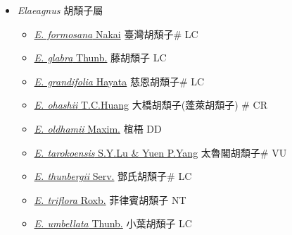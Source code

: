 
  \begin{itemize}
 \item[] \textit{Elaeagnus} 胡頹子屬
                    
  \begin{itemize}
        \item[] \href{http://www.theplantlist.org/tpl1.1/search?q=Elaeagnus+formosana}{\textit{E. formosana} Nakai}   臺灣胡頹子\# LC
        \item[] \href{http://www.theplantlist.org/tpl1.1/search?q=Elaeagnus+glabra}{\textit{E. glabra} Thunb.}   藤胡頹子 LC
        \item[] \href{http://www.theplantlist.org/tpl1.1/search?q=Elaeagnus+grandifolia}{\textit{E. grandifolia} Hayata}   慈恩胡頹子\# LC
        \item[] \href{http://www.theplantlist.org/tpl1.1/search?q=Elaeagnus+ohashii}{\textit{E. ohashii} T.C.Huang}     大橋胡頹子(蓬萊胡頹子)  \# CR
        \item[] \href{http://www.theplantlist.org/tpl1.1/search?q=Elaeagnus+oldhamii}{\textit{E. oldhamii} Maxim.}   椬梧 DD
        \item[] \href{http://www.theplantlist.org/tpl1.1/search?q=Elaeagnus+tarokoensis}{\textit{E. tarokoensis} S.Y.Lu \& Yuen P.Yang}   太魯閣胡頹子\# VU
        \item[] \href{http://www.theplantlist.org/tpl1.1/search?q=Elaeagnus+thunbergii}{\textit{E. thunbergii} Serv.}   鄧氏胡頹子\# LC
        \item[] \href{http://www.theplantlist.org/tpl1.1/search?q=Elaeagnus+triflora}{\textit{E. triflora} Roxb.}   菲律賓胡頹子 NT
        \item[] \href{http://www.theplantlist.org/tpl1.1/search?q=Elaeagnus+umbellata}{\textit{E. umbellata} Thunb.}   小葉胡頹子 LC
  \end{itemize}
  \end{itemize}
